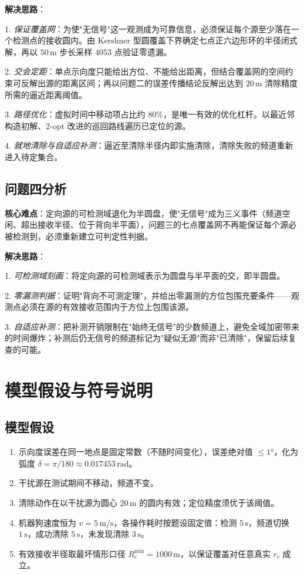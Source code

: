 \documentclass[12pt,a4paper]{ctexart}
\begin{document}
\textbf{解决思路}：

1. \emph{保证覆盖网}：为使"无信号"这一观测成为可靠信息，必须保证每个源至少落在一个检测点的接收圆内。由 Kershner 型圆覆盖下界确定七点正六边形环的半径闭式解，再以 $50\,\text{m}$ 步长采样 $4053$ 点验证零遗漏。

2. \emph{交会定距}：单点示向度只能给出方位、不能给出距离，但结合覆盖网的空间约束可反解出源的距离区间；再以问题二的误差传播结论反解出达到 $20\,\text{m}$ 清除精度所需的逼近距离阈值。

3. \emph{路径优化}：虚拟时间中移动项占比约 $80\%$，是唯一有效的优化杠杆。以最近邻构造初解、$2$-opt 改进的巡回路线遍历已定位的源。

4. \emph{就地清除与自适应补测}：逼近至清除半径内即实施清除，清除失败的频道重新进入待定集合。

\subsection{问题四分析}

\textbf{核心难点}：定向源的可检测域退化为半圆盘，使"无信号"成为三义事件（频道空闲、超出接收半径、位于背向半平面），问题三的七点覆盖网不再能保证每个源必被检测到，必须重新建立可判定性判据。

\textbf{解决思路}：

1. \emph{可检测域刻画}：将定向源的可检测域表示为圆盘与半平面的交，即半圆盘。

2. \emph{零漏测判据}：证明"背向不可测定理"，并给出零漏测的方位包围充要条件——观测点必须在源的有效接收范围内于方位上包围该源。

3. \emph{自适应补测}：把补测开销限制在"始终无信号"的少数频道上，避免全域加密带来的时间爆炸；补测后仍无信号的频道标记为"疑似无源"而非"已清除"，保留后续复查的可能。

\section{模型假设与符号说明}
\label{sec:model}

\subsection{模型假设}

\begin{enumerate}[label=\textbf{假设\arabic*}]
  \item 示向度误差在同一地点是固定常数（不随时间变化），误差绝对值 $\leq1°$，化为弧度 $\delta=\pi/180\approx0.017453\,\text{rad}$。
  \item 干扰源在测试期间不移动，频道不变。
  \item 清除动作在以干扰源为圆心 $20\,\text{m}$ 的圆内有效；定位精度须优于该阈值。
  \item 机器狗速度恒为 $v=5\,\text{m/s}$，各操作耗时按题设固定值：检测 $5\,\text{s}$，频道切换 $1\,\text{s}$，成功清除 $5\,\text{s}$，未发现清除 $3\,\text{s}$。
  \item 有效接收半径取最坏情形口径 $R_c^{\min}=1000\,\text{m}$，以保证覆盖对任意真实 $r_c$ 成立。
\end{enumerate}
\end{document}
